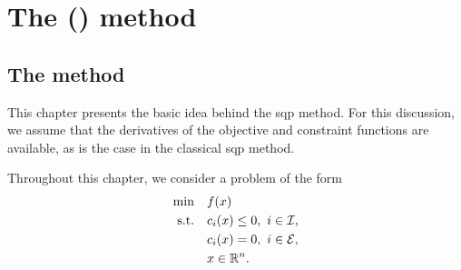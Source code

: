 %
%
%
\chapter{The  () method}
\label{ch:sqp}

\section{The method}

This chapter presents the basic idea behind the \gls{sqp} method.
For this discussion, we assume that the derivatives of the objective and constraint functions are available, as is the case in the classical \gls{sqp} method.

Throughout this chapter, we consider a problem of the form
\begin{subequations}
    \label{eq:problem-cobyqa-sqp}
    \begin{align}
        \min        & \quad \obj(\iter) \label{eq:problem-cobyqa-sqp-obj}\\
        \text{s.t.} & \quad \con{i}(\iter) \le 0, ~ i \in \iub, \label{eq:problem-cobyqa-sqp-ub}\\
                    & \quad \con{i}(\iter) = 0, ~ i \in \ieq, \label{eq:problem-cobyqa-sqp-eq}\\
                    & \quad \iter \in \R^n. \nonumber
    \end{align}
\end{subequations}

